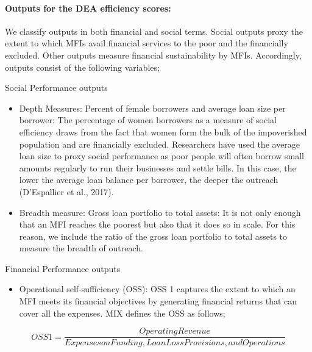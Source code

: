 \documentclass[
]{article}
\providecommand{\tightlist}{%
  \setlength{\itemsep}{0pt}\setlength{\parskip}{0pt}}
\begin{document}
\hypertarget{outputs-for-the-dea-efficiency-scores}{%
\paragraph{Outputs for the DEA efficiency
scores:}\label{outputs-for-the-dea-efficiency-scores}}

We classify outputs in both financial and social terms. Social outputs
proxy the extent to which MFIs avail financial services to the poor and
the financially excluded. Other outputs measure financial sustainability
by MFIs. Accordingly, outputs consist of the following variables;

\vspace{5mm}

Social Performance outputs \vspace{2mm}

\begin{itemize}
\item
  Depth Measures: Percent of female borrowers and average loan size per
  borrower: The percentage of women borrowers as a measure of social
  efficiency draws from the fact that women form the bulk of the
  impoverished population and are financially excluded. Researchers have
  used the average loan size to proxy social performance as poor people
  will often borrow small amounts regularly to run their businesses and
  settle bills. In this case, the lower the average loan balance per
  borrower, the deeper the outreach (D'Espallier et al., 2017).
\item
  Breadth measure: Gross loan portfolio to total assets: It is not only
  enough that an MFI reaches the poorest but also that it does so in
  scale. For this reason, we include the ratio of the gross loan
  portfolio to total assets to measure the breadth of outreach.
\end{itemize}

\vspace{5mm}

Financial Performance outputs \vspace{2mm}

\begin{itemize}
\tightlist
\item
  Operational self-sufficiency (OSS): OSS 1 captures the extent to which
  an MFI meets its financial objectives by generating financial returns
  that can cover all the expenses. MIX defines the OSS as follows;
\end{itemize}

\begin{equation}

OSS1 = \frac{Operating Revenue}{Expenses on Funding, Loan Loss Provisions, and Operations}

\end{equation}
\end{document}
